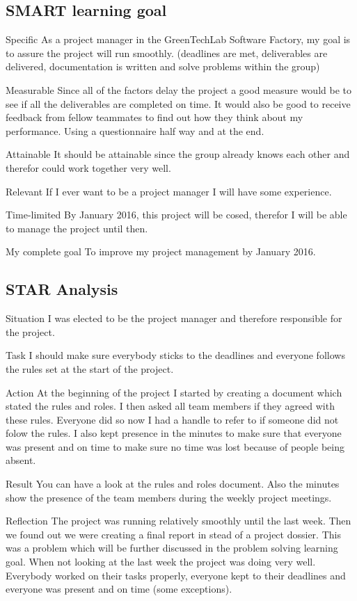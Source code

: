\documentclass[12pt]{article}
\begin{document}
	\subsection{SMART learning goal}
	\begin{SMART}
	    \item[Specific] As a project manager in the GreenTechLab Software Factory, my goal is to assure the project will run smoothly. (deadlines are met, deliverables are delivered, documentation is written and solve problems within the group)
	    \item[Measurable] Since all of the factors delay the project a good measure would be to see if all the deliverables are completed on time. It would also be good to receive feedback from fellow teammates to find out how they think about my performance. Using a questionnaire half way and at the end.
	    \item[Attainable] It should be attainable since the group already knows each other and therefor could work together very well.
	    \item[Relevant] If I ever want to be a project manager I will have some experience.
	    \item[Time-limited] By January 2016, this project will be cosed, therefor I will be able to manage the project until then.
	    \item[My complete goal] To improve my project management by January 2016.
	\end{SMART}
	
	\subsection{STAR Analysis}
	\begin{STAR}
	    \item[Situation] I was elected to be the project manager and therefore responsible for the project.
	    \item[Task] I should make sure everybody sticks to the deadlines and everyone follows the rules set at the start of the project.
	    \item[Action] At the beginning of the project I started by creating a document which stated the rules and roles. I then asked all team members if they agreed with these rules. Everyone did so now I had a handle to refer to if someone did not folow the rules. I also kept presence in the minutes to make sure that everyone was present and on time to make sure no time was lost because of people being absent.
	    \item[Result] 
	    You can have a look at the rules and roles document. Also the minutes show the presence of the team members during the weekly project meetings.
	    \item [Reflection]
	    The project was running relatively smoothly until the last week. Then we found out we were creating a final report in stead of a project dossier. This was a problem which will be further discussed in the problem solving learning goal. When not looking at the last week the project was doing very well. Everybody worked on their tasks properly, everyone kept to their deadlines and everyone was present and on time (some exceptions).
	\end{STAR}
	
\end{document}
